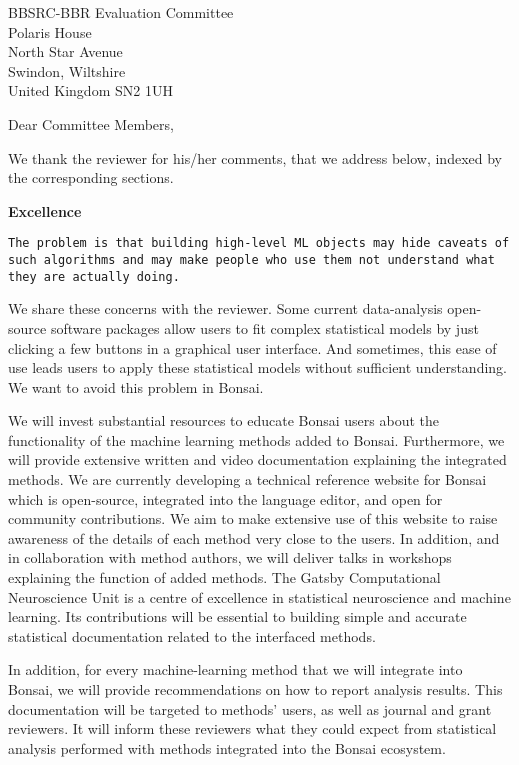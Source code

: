 \documentclass[12pt]{letter}
\begin{document}
\begin{letter}{
    BBSRC-BBR Evaluation Committee\\
    Polaris House\\
    North Star Avenue\\
    Swindon, Wiltshire\\
    United Kingdom SN2 1UH
}
\opening{Dear Committee Members,}

We thank the reviewer for his/her comments, that we address below, indexed by
the corresponding sections.

\noindent\textbf{Excellence}

\texttt{The problem is that building high-level ML objects may hide caveats of
such algorithms and may make people who use them not understand what they are
actually doing.}

We share these concerns with the reviewer. Some current data-analysis open-source
software packages allow users to fit complex statistical models by just
clicking a few buttons in a graphical user interface. And sometimes, this ease
of use leads users to apply these statistical models without sufficient
understanding. We want to avoid this problem in Bonsai.

We will invest substantial resources to educate Bonsai users about the
functionality of the machine learning methods added to Bonsai. Furthermore, we will provide
extensive written and video documentation explaining the integrated methods. We are currently developing a technical reference  website for Bonsai which is open-source, integrated into the language editor, and open for community contributions. We aim to make extensive use of this website to raise awareness of the details of each method very close to the users.  In
addition, and in collaboration with method authors, we will deliver talks in
workshops explaining the function of added methods.
%
The Gatsby Computational Neuroscience Unit is a centre of excellence in
statistical neuroscience and machine learning. Its contributions will be
essential to building simple and accurate statistical documentation related to
the interfaced methods.

In addition, for every machine-learning method that we will integrate into
Bonsai, we will provide recommendations on how to report analysis results.
This documentation will be targeted to methods' users, as well as journal and
grant reviewers. It will inform these reviewers what they could expect from
statistical analysis performed with methods integrated into the Bonsai
ecosystem.


\end{letter}
\end{document}
